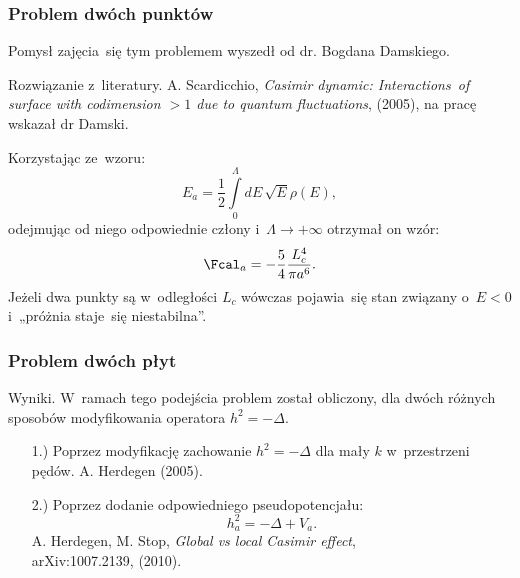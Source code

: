 \documentclass[10pt,t]{beamer}
\begin{document}
\begin{frame}
  \frametitle{Problem dwóch punktów}


  Pomysł zajęcia~się tym problemem wyszedł od dr. Bogdana Damskiego.

  Rozwiązanie z~literatury. A. Scardicchio, \textit{Casimir dynamic:
    Interactions~of surface with codimension $> 1$ due to quantum
    fluctuations}, (2005), na pracę wskazał dr Damski.

  Korzystając ze~wzoru:
  \begin{equation}
    \label{eq:Efekt-Casimira-15}
    E_{ a } =
    \frac{ 1 }{ 2 } \int\limits_{ 0 }^{ \Lambda } dE \, \sqrt{E} \rho( E ),
  \end{equation}
  odejmując od niego odpowiednie człony
  i~$\Lambda \to +\infty$ otrzymał on wzór:
  \begin{equation}
    \label{eq:Efekt-Casimira-16}
    \Fcal_{ a } =
    -\frac{ 5 }{ 4 } \frac{ L_{ c }^{ 4 } }{ \pi a^{ 6 } }.
  \end{equation}
  Jeżeli dwa punkty są w~odległości $L_{ c }$ wówczas pojawia~się
  stan związany o~$E < 0$ i~„próżnia staje~się niestabilna”.

\end{frame}





\begin{frame}
  \frametitle{Problem dwóch płyt}


  Wyniki. W~ramach tego podejścia problem został obliczony, dla dwóch
  różnych sposobów modyfikowania operatora $h^{ 2 } = -\Delta$.
  \begin{itemize}
    \RaggedRight

  \item[1.)] Poprzez modyfikację zachowanie $h^{ 2 } = -\Delta$
    dla mały $k$ w~przestrzeni pędów. A. Herdegen (2005).

  \item[2.)] Poprzez dodanie odpowiedniego pseudopotencjału:
    \begin{equation}
      \label{eq:Efekt-Casimira-17}
      h_{ a }^{ 2 } = -\Delta + V_{ a }.
    \end{equation}
    A. Herdegen, M. Stop, \textit{Global vs local Casimir effect}, \\
    arXiv:1007.2139, (2010).

  \end{itemize}

\end{frame}
\end{document}
